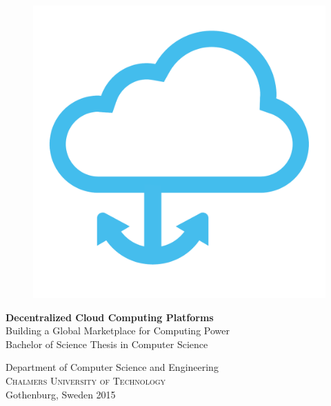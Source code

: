 
\begin{titlepage}
			
\addtolength{\voffset}{2cm}

\begin{figure}[h!]
\centering
\vspace{2cm}	%
\includegraphics[width=0.6\linewidth]{figure/logo}
\end{figure}

\mbox{}
\vfill
\renewcommand{\familydefault}{\sfdefault} \normalfont %
\noindent \textbf{\Huge Decentralized Cloud Computing Platforms}\\[0.2cm]
{\Large Building a Global Marketplace for Computing Power}\\[0.5cm]
Bachelor of Science Thesis in Computer Science \\[0.5cm]

\noindent Department of Computer Science and Engineering \\
\textsc{Chalmers University of Technology} \\
Gothenburg, Sweden 2015

\renewcommand{\familydefault}{\rmdefault} \normalfont %
\end{titlepage}


